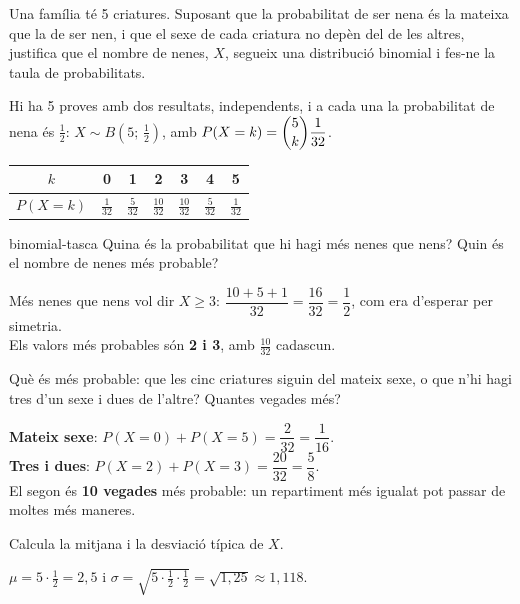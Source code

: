 \begin{apartats}

Una família té 5 criatures. Suposant que la probabilitat de ser nena és la mateixa que la de ser nen, i
que el sexe de cada criatura no depèn del de les altres, justifica que el nombre de nenes, $X$, segueix
una distribució binomial i fes-ne la taula de probabilitats.

\begin{solucio}
Hi ha 5 proves amb dos resultats, independents, i a cada una la probabilitat de nena és $\frac12$:
$X\sim B\left(5;\,\tfrac12\right)$, amb $P(X=k)=\dbinom5k\dfrac1{32}$.
\begin{center}
\begin{tabular}{c|cccccc}
$k$ & 0 & 1 & 2 & 3 & 4 & 5\\ \hline
$P(X=k)$ & $\frac1{32}$ & $\frac5{32}$ & $\frac{10}{32}$ & $\frac{10}{32}$ & $\frac5{32}$ & $\frac1{32}$
\end{tabular}
\end{center}
\end{solucio}

\begin{tria}{binomial-tasca}
Quina és la probabilitat que hi hagi més nenes que nens? Quin és el nombre de nenes més probable?

\begin{solucio}
Més nenes que nens vol dir $X\ge3$: $\dfrac{10+5+1}{32}=\dfrac{16}{32}=\dfrac12$, com era d'esperar per
simetria.\\
Els valors més probables són \textbf{2 i 3}, amb $\frac{10}{32}$ cadascun.
\end{solucio}

Què és més probable: que les cinc criatures siguin del mateix sexe, o que n'hi hagi tres d'un sexe i dues
de l'altre? Quantes vegades més?

\begin{solucio}
\textbf{Mateix sexe}: $P(X=0)+P(X=5)=\dfrac2{32}=\dfrac1{16}$.\\
\textbf{Tres i dues}: $P(X=2)+P(X=3)=\dfrac{20}{32}=\dfrac58$.\\
El segon és \textbf{10 vegades} més probable: un repartiment més igualat pot passar de moltes més
maneres.
\end{solucio}
\end{tria}

\begin{nomesllarg}
Calcula la mitjana i la desviació típica de $X$.

\begin{solucio}
$\mu=5\cdot\frac12=2{,}5$ i $\sigma=\sqrt{5\cdot\frac12\cdot\frac12}=\sqrt{1{,}25}\approx1{,}118$.
\end{solucio}
\end{nomesllarg}

\end{apartats}
